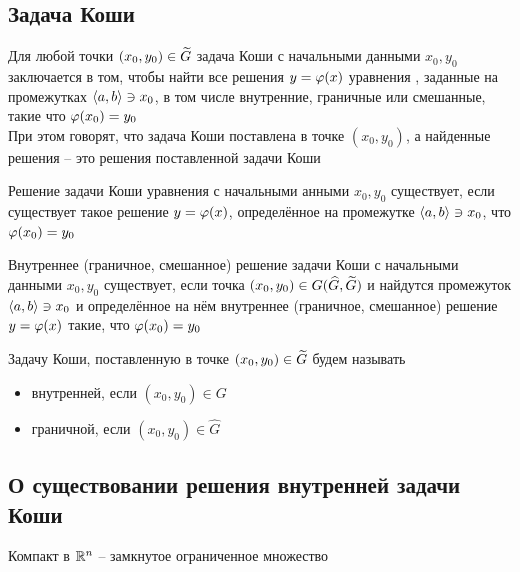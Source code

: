 \subsection{Задача Коши}

\begin{problem}
    Для любой точки $ (x_0, y_0) \in \widetilde{G} $ задача Коши с начальными данными $ x_0, y_0 $ заключается в том, чтобы найти все решения $ y = \varphi(x) $ уравнения , заданные на промежутках $ \Braket{a, b} \ni x_0 $, в том числе внутренние, граничные или смешанные, такие что $ \varphi(x_0) = y_0 $ \\
    При этом говорят, что задача Коши поставлена в точке $ (x_0, y_0) $, а найденные решения -- это решения поставленной задачи Коши
\end{problem}

\begin{definition}
    Решение задачи Коши уравнения  с начальными анными $ x_0, y_0 $ существует, если существует такое решение $ y = \varphi(x) $, определённое на промежутке $ \Braket{a, b} \ni x_0 $, что $ \varphi(x_0) = y_0 $
\end{definition}

\begin{definition}
    Внутреннее (граничное, смешанное) решение задачи Коши с начальными данными $ x_0, y_0 $ существует, если точка $ (x_0, y_0) \in G(\widehat{G}, \widetilde{G}) $ и найдутся промежуток $ \Braket{a, b} \ni x_0 $ и определённое на нём внутреннее (граничное, смешанное) решение $ y = \varphi(x) $ такие, что $ \varphi(x_0) = y_0 $
\end{definition}

\begin{definition}
    Задачу Коши, поставленную в точке $ (x_0, y_0) \in \widetilde{G} $ будем называть
    \begin{itemize}
    	\item внутренней, если $ (x_0, y_0) \in G $
        \item граничной, если $ (x_0, y_0) \in \hat{G} $
    \end{itemize}
\end{definition}

\subsection{О существовании решения внутренней задачи Коши}

\begin{remind}
	Компакт в $ \mathbb{R}^n $ -- замкнутое ограниченное множество
\end{remind}

